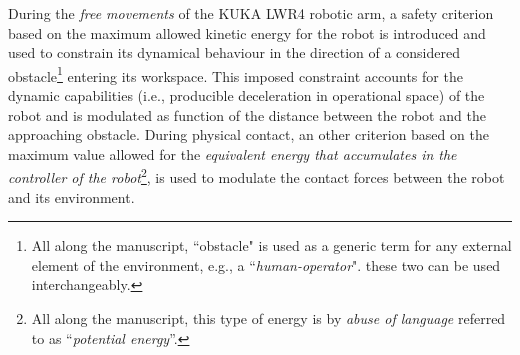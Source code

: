 %
%
%
During the \textit{free movements} of the KUKA LWR4 robotic arm, a safety criterion based on the maximum allowed kinetic energy for the robot is introduced  and used to constrain its dynamical behaviour in the direction of a considered obstacle\footnote{All along the manuscript, ``obstacle" is used as a generic term for any external element of the environment, e.g., a ``\textit{human-operator}". these two can be used interchangeably.} entering its workspace. This imposed constraint accounts for the dynamic capabilities (i.e., producible deceleration in operational space) of the robot and is modulated as function of the distance between the robot and the approaching obstacle. During physical contact, an other criterion based on the maximum value allowed for the \textit{equivalent energy that accumulates in the controller of the robot}\footnote{All along the manuscript, this type of energy is by \textit{abuse of language} referred to as ``\textit{potential energy}''.}, is used to modulate the contact forces between the robot and its environment. 
%
%
%
%
%
%
%
%
%
%

